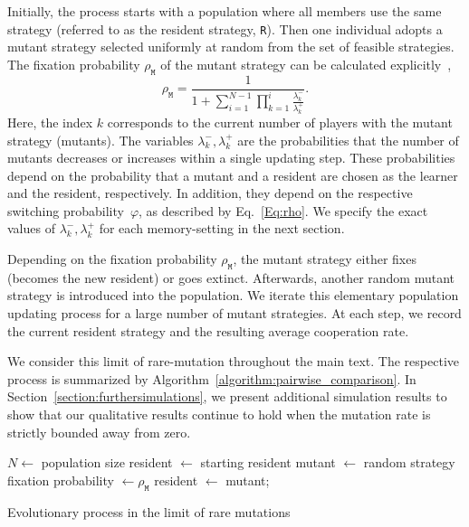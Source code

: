 \documentclass[11pt]{article}
\def\resident{\texttt{R}}
\def\mutant{\texttt{M}}
\theoremstyle{plainCl1}
\theoremstyle{plainCl2}
\begin{document}

Initially, the process starts with a population where all members use the same strategy (referred to as the resident strategy, \resident). 
Then one individual adopts a mutant strategy selected uniformly at random from the set of feasible strategies.
The fixation probability \(\rho_{\mutant}\) of the mutant strategy can be calculated explicitly~\citep{nowak:Nature:2004},
\begin{equation}\label{eq:fixation_probability}
    \rho_{\mutant} = \frac{1}{1+\sum\limits_{i=1}^{N-1}\prod\limits_{k=1}^i \frac{\lambda^-_k}{\lambda^+_k}}.
\end{equation}
Here, the index $k$ corresponds to the current number of players with the mutant strategy (mutants). 
The variables \(\lambda^-_k, \lambda^+_k\) are the probabilities that the number of mutants decreases or increases within a single updating step. 
These probabilities depend on the probability that a mutant and a resident are chosen as the learner and the resident, respectively. 
In addition, they depend on the respective switching probability~$\varphi$, as described by Eq.~\eqref{Eq:rho}. 
We specify the exact values of  \(\lambda^-_k, \lambda^+_k\) for each memory-setting in the next section. 

Depending on the fixation probability \(\rho_{\mutant}\), the mutant strategy either fixes (becomes the new resident) or goes extinct. 
Afterwards, another random mutant strategy is introduced into the population. 
We iterate this elementary population updating process for a large number of mutant strategies. 
At each step, we record the current resident strategy and the resulting average cooperation rate. 

We consider this limit of rare-mutation throughout the main text. 
The respective process is summarized by Algorithm~\ref{algorithm:pairwise_comparison}.
In Section~\ref{section:furthersimulations}, we present additional simulation results to show that our qualitative results continue to hold when the mutation rate is strictly bounded away from zero. 


\begin{algorithm}[t]
  \SetAlgoLined
  $N \leftarrow$ population size\;
  resident $\leftarrow$ starting resident\;
   {mutant $\leftarrow$ random strategy\;
   fixation probability $\leftarrow \rho_\mutant $\;
   \If{$\rho_{\mutant} >$ random: $i \rightarrow [0,1]$}
   {resident $\leftarrow$ mutant;}}
   \caption{Evolutionary process in the limit of rare mutations}\label{algorithm:pairwise_comparison}
\end{algorithm}
\end{document}
